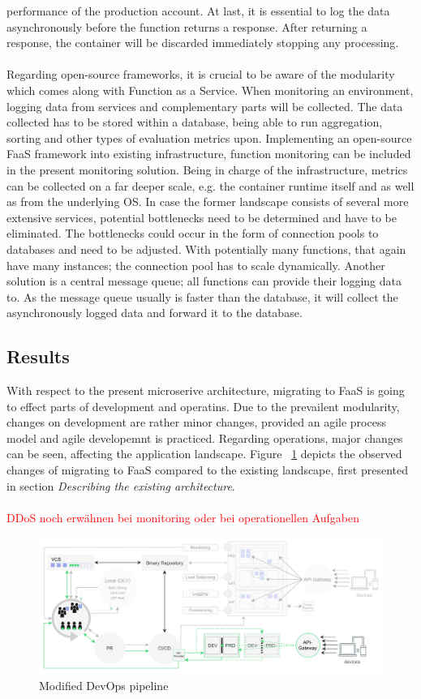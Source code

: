 \documentclass[a4paper,twoside,11pt, pagesize]{scrartcl}
\begin{document}
performance of the production account. At last, it is essential to log the data asynchronously before the function returns a response. After returning a response, the container will be discarded immediately stopping any processing.\\\\ Regarding open-source frameworks, it is crucial to be aware of the modularity which comes along with Function as a Service. When monitoring an environment, logging data from services and complementary parts will be collected. The data collected has to be stored within a database, being able to run aggregation, sorting and other types of evaluation metrics upon. Implementing an open-source FaaS framework into existing infrastructure, function monitoring can be included in the present monitoring solution. Being in charge of the infrastructure, metrics can be collected on a far deeper scale, e.g. the container runtime itself and as well as from the underlying OS. In case the former landscape consists of several more extensive services, potential bottlenecks need to be determined and have to be eliminated. The bottlenecks could occur in the form of connection pools to databases and need to be adjusted. With potentially many functions, that again have many instances; the connection pool has to scale dynamically. Another solution is a central message queue; all functions can provide their logging data to. As the message queue usually is faster than the database, it will collect the asynchronously logged data and forward it to the database.
\subsection{Results}
With respect to the present microserive architecture, migrating to FaaS is going to effect parts of development and operatins. Due to the prevailent modularity, changes on development are rather minor changes, provided an agile process model and agile developemnt is practiced. Regarding operations, major changes can be seen, affecting the application landscape. Figure ~\ref{fig:devopsModified} depicts the observed changes of migrating to FaaS compared to the existing landscape, first presented in section \textit{Describing the existing architecture}. \\\\ 
\textcolor{red}{DDoS noch erwähnen bei monitoring oder bei operationellen Aufgaben}
\begin{figure}[H]
  \caption{Modified DevOps pipeline}
  \label{fig:devopsModified}
  \centering
  \includegraphics[width=1\textwidth]{devopsModified}
\end{figure}
\newpage
\end{document}

